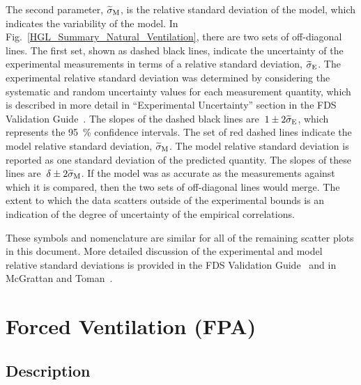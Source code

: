 The second parameter, $\widetilde{\sigma}\sb{M}$, is the relative standard deviation of the model, which indicates the variability of the model. In Fig.~\ref{HGL_Summary_Natural_Ventilation}, there are two sets of off-diagonal lines. The first set, shown as dashed black lines, indicate the uncertainty of the experimental measurements in terms of a relative standard deviation, $\widetilde{\sigma}\sb{E}$. The experimental relative standard deviation was determined by considering the systematic and random uncertainty values for each measurement quantity, which is described in more detail in ``Experimental Uncertainty'' section in the FDS Validation Guide~\cite{FDS_Validation_Guide}. The slopes of the dashed black lines are~$1 \pm 2\widetilde{\sigma}\sb{E}$, which represents the \SI{95}{\percent} confidence intervals. The set of red dashed lines indicate the model relative standard deviation, $\widetilde{\sigma}\sb{M}$. The model relative standard deviation is reported as one standard deviation of the predicted quantity. The slopes of these lines are~$\delta \pm 2\widetilde{\sigma}\sb{M}$. If the model was as accurate as the measurements against which it is compared, then the two sets of off-diagonal lines would merge. The extent to which the data scatters outside of the experimental bounds is an indication of the degree of uncertainty of the empirical correlations.

These symbols and nomenclature are similar for all of the remaining scatter plots in this document. More detailed discussion of the experimental and model relative standard deviations is provided in the FDS Validation Guide~\cite{FDS_Validation_Guide} and in McGrattan and Toman~\cite{McGrattan:Metrologia}.


\clearpage


\section{Forced Ventilation (FPA)}
\label{sec:FPA}

\subsection*{Description}

